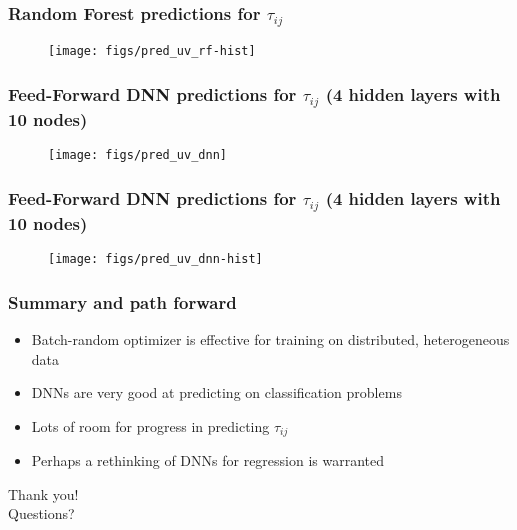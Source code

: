 \documentclass[aspectratio=169]{beamer}
\newcommand{\backupbegin}{
    \newcounter{finalframe}
    \setcounter{finalframe}{\value{framenumber}}
}
\newcommand{\backupend}{
    \setcounter{framenumber}{\value{finalframe}}
}
\begin{document}
\begin{frame}
    \frametitle{Random Forest predictions for $\tau_{ij}$}
    \begin{figure}
        \centering
        \texttt{[image: figs/pred\_uv\_rf-hist]}
    \end{figure}
\end{frame}
\begin{frame}
    \frametitle{Feed-Forward DNN predictions for $\tau_{ij}$ (4 hidden layers with 10 nodes)}
    \begin{figure}
        \centering
        \texttt{[image: figs/pred\_uv\_dnn]}
    \end{figure}
\end{frame}
\begin{frame}
    \frametitle{Feed-Forward DNN predictions for $\tau_{ij}$ (4 hidden layers with 10 nodes)}
    \begin{figure}
        \centering
        \texttt{[image: figs/pred\_uv\_dnn-hist]}
    \end{figure}
\end{frame}
 \begin{frame}
     \frametitle{Summary and path forward}
         \begin{itemize}
             \item Batch-random optimizer is effective for training on distributed, heterogeneous data
             \item DNNs are very good at predicting on classification problems
             \item Lots of room for progress in predicting $\tau_{ij}$
             \item Perhaps a rethinking of DNNs for regression is warranted
         \end{itemize}
 \end{frame}
\begin{frame}
    \begin{center}
        \vspace{6pt}
        {\huge Thank you!} \\
        \vspace{12pt}
        {\huge Questions?}
    \end{center}
\end{frame}
\backupbegin
\backupend
\end{document}
